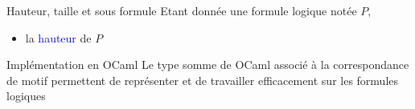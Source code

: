 \documentclass[10pt]{beamer}
\begin{document}
\begin{frame}{\Ctitle}{\stitle}
    \begin{block}{Hauteur, taille et sous formule}
        Etant donnée une formule logique notée $P$,
        \begin{itemize}
            \item<2-> la \textcolor{blue}{hauteur} de $P$ 
        \end{itemize}
    \end{block}
\end{frame}

\begin{frame}{\Ctitle}{\stitle}
    \begin{block}{Implémentation en OCaml}
        Le type somme de OCaml associé à la correspondance de motif permettent de représenter et de travailler efficacement sur les formules logiques
    \end{block}
\end{frame}
\end{document}
